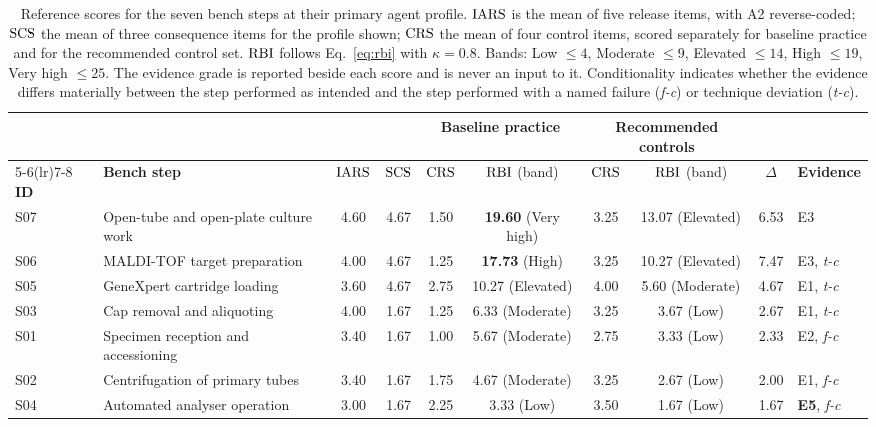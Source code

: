 \begin{table}[t]
\caption{Reference scores for the seven bench steps at their primary agent profile.
$\textrm{IARS}$ is the mean of five release items, with A2 reverse-coded; $\textrm{SCS}$ the mean of three
consequence items for the profile shown; $\textrm{CRS}$ the mean of four control items, scored
separately for baseline practice and for the recommended control set. $\textrm{RBI}$ follows
Eq.~\eqref{eq:rbi} with $\kappa=0.8$. Bands: Low $\le 4$, Moderate $\le 9$, Elevated
$\le 14$, High $\le 19$, Very high $\le 25$. The evidence grade is reported beside each
score and is never an input to it. Conditionality indicates whether the evidence differs
materially between the step performed as intended and the step performed with a named
failure (\textit{f-c}) or technique deviation (\textit{t-c}).}
\label{tab:main}
\small
\begin{tabular}{@{}llcccccccl@{}}
\toprule
& & & & \multicolumn{2}{c}{\textbf{Baseline practice}} & \multicolumn{2}{c}{\textbf{Recommended controls}} & & \\
\cmidrule(lr){5-6}\cmidrule(lr){7-8}
\textbf{ID} & \textbf{Bench step} & $\textrm{IARS}$ & $\textrm{SCS}$ & $\textrm{CRS}$ & $\textrm{RBI}$ (band) & $\textrm{CRS}$ & $\textrm{RBI}$ (band) & $\Delta$ & \textbf{Evidence} \\
\midrule
S07 & Open-tube and open-plate culture work & 4.60 & 4.67 & 1.50 & \textbf{19.60} (Very high) & 3.25 & 13.07 (Elevated) & 6.53 & E3 \\
S06 & MALDI-TOF target preparation          & 4.00 & 4.67 & 1.25 & \textbf{17.73} (High)      & 3.25 & 10.27 (Elevated) & 7.47 & E3, \textit{t-c} \\
S05 & GeneXpert cartridge loading           & 3.60 & 4.67 & 2.75 & 10.27 (Elevated)           & 4.00 & 5.60 (Moderate)  & 4.67 & E1, \textit{t-c} \\
S03 & Cap removal and aliquoting            & 4.00 & 1.67 & 1.25 & 6.33 (Moderate)            & 3.25 & 3.67 (Low)       & 2.67 & E1, \textit{t-c} \\
S01 & Specimen reception and accessioning   & 3.40 & 1.67 & 1.00 & 5.67 (Moderate)            & 2.75 & 3.33 (Low)       & 2.33 & E2, \textit{f-c} \\
S02 & Centrifugation of primary tubes       & 3.40 & 1.67 & 1.75 & 4.67 (Moderate)            & 3.25 & 2.67 (Low)       & 2.00 & E1, \textit{f-c} \\
S04 & Automated analyser operation          & 3.00 & 1.67 & 2.25 & 3.33 (Low)                 & 3.50 & 1.67 (Low)       & 1.67 & \textbf{E5}, \textit{f-c} \\
\bottomrule
\end{tabular}
\end{table}

